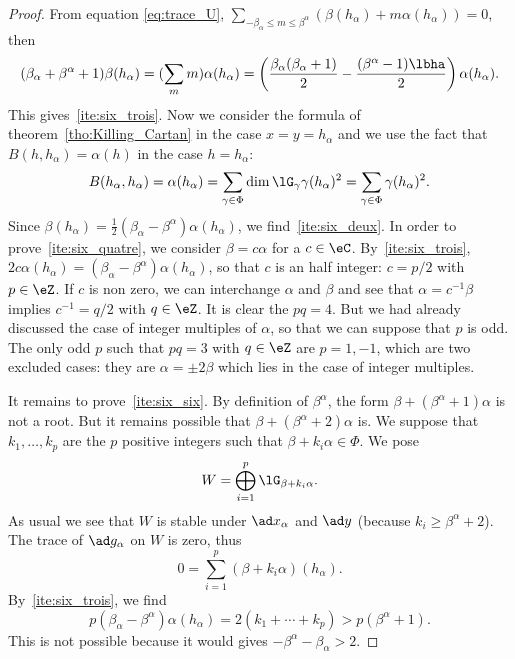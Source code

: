\begin{proof}
	From equation \eqref{eq:trace_U}, $\sum_{-\beta_{\alpha}\leq m\leq\beta^{\alpha}}( \beta(h_{\alpha})+m\alpha(h_{\alpha}) )=0$, then
	\begin{equation}
		(\beta_{\alpha}+\beta^{\alpha}+1)\beta(h_{\alpha})=(\sum_m m)\alpha(h_{\alpha})\\
		=\left(
		\frac{\beta_{\alpha}(\beta_{\alpha}+1)}{2}-\frac{(\beta^{\alpha}-1)\lbha}{2}
		\right)\alpha(h_{\alpha}).
	\end{equation}
	This gives~\ref{ite:six_trois}. Now we consider the formula of theorem~\ref{tho:Killing_Cartan} in the case $x=y=h_{\alpha}$ and we use the fact that $B(h,h_{\alpha})=\alpha(h)$ in the case $h=h_{\alpha}$:
	\begin{equation}
		B(h_{\alpha},h_{\alpha})=\alpha(h_{\alpha})\\
		=\sum_{\gamma\in\Phi}\dim\lG_{\gamma}\gamma(h_{\alpha})^2\\
		=\sum_{\gamma\in\Phi}\gamma(h_{\alpha})^2.
	\end{equation}
	Since $\beta(h_{\alpha})=\frac{1}{2}(\beta_{\alpha}-\beta^{\alpha})\alpha(h_{\alpha})$, we find~\ref{ite:six_deux}. In order to prove~\ref{ite:six_quatre}, we consider $\beta=c\alpha$ for a $c\in\eC$. By~\ref{ite:six_trois}, $2c\alpha(h_{\alpha})=(\beta_{\alpha}-\beta^{\alpha})\alpha(h_{\alpha})$, so that $c$ is an half integer: $c=p/2$ with $p\in\eZ$. If $c$ is non zero, we can interchange $\alpha$ and $\beta$ and see that $\alpha=c^{-1}\beta$ implies $c^{-1}=q/2$ with $q\in\eZ$. It is clear the $pq=4$. But we had already discussed the case of integer multiples of $\alpha$, so that we can suppose that $p$ is odd. The only odd $p$ such that $pq=3$ with $q\in\eZ$ are $p=1,-1$, which are two excluded cases: they are $\alpha=\pm 2\beta$ which lies in the case of integer multiples.

	It remains to prove~\ref{ite:six_six}. By definition of $\beta^{\alpha}$, the form $\beta+(\beta^{\alpha}+1)\alpha$ is not a root. But it remains possible that $\beta+(\beta^{\alpha}+2)\alpha$ is. We suppose that $k_1,\ldots,k_p$ are the $p$ positive integers such that $\beta+k_i\alpha\in\Phi$. We pose
	\[
		W=\bigoplus_{i=1}^p\lG_{\beta+k_i\alpha}.
	\]
	As usual we see that $W$ is stable under $\ad x_{\alpha}$ and $\ad y$ (because $k_i\geq\beta^{\alpha}+2$). The trace of $\ad g_{\alpha}$ on $W$ is zero, thus
	\begin{equation}
		0=\sum_{i=1}^p(\beta+k_i\alpha)(h_{\alpha}).
	\end{equation}
	By~\ref{ite:six_trois}, we find
	\[
		p(\beta_{\alpha}-\beta^{\alpha})\alpha(h_{\alpha})=2(k_1+\cdots+k_p)>p(\beta^{\alpha}+1).
	\]
	This is not possible because it would gives $-\beta^{\alpha}-\beta_{\alpha}>2$.
\end{proof}

